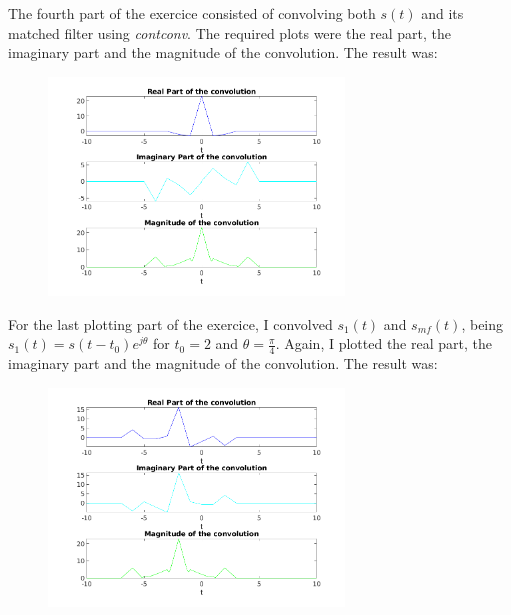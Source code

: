 \documentclass[a4paper,11pt]{article}
\begin{document}
The fourth part of the exercice consisted of convolving both $s(t)$ and its matched filter using \textit{contconv}. The required plots were the real part, the imaginary part and the magnitude of the convolution. The result was:

\begin{figure}[!hp]
    \begin{center}
      \includegraphics[width=0.7\textwidth]{images/exercice_3d.png}
    \end{center}
\end{figure}

For the last plotting part of the exercice, I convolved $s_{1}(t)$ and $s_{mf}(t)$, being $s_{1}(t) = s(t-t_{0})e^{j\theta}$ for $t_{0} = 2$ and $\theta = \frac{\pi}{4}$. Again, I plotted the real part, the imaginary part and the magnitude of the convolution. The result was:

\begin{figure}[!hp]
    \begin{center}
      \includegraphics[width=0.7\textwidth]{images/exercice_3e.png}
    \end{center}
\end{figure}
\end{document}
